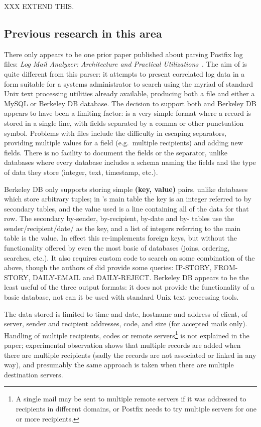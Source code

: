 XXX EXTEND THIS\@.


\subsection{Previous research in this area}

\label{prior art}

There only appears to be one prior paper published about parsing Postfix
log files: \textit{Log Mail Analyzer: Architecture and Practical
Utilizations\/}~\cite{log-mail-analyser}.  The aim of \LMA{} is quite
different from this parser: it attempts to present correlated log data in a
form suitable for a systems administrator to search using the myriad of
standard Unix text processing utilities already available, producing both a
\CSV{} file and either a MySQL or Berkeley DB database.  The decision to
support both \CSV{} and Berkeley DB appears to have been a limiting factor:
\CSV{} is a very simple format where a record is stored in a single line,
with fields separated by a comma or other punctuation symbol.  Problems
with \CSV{} files include the difficulty in escaping separators, providing
multiple values for a field (e.g.\ multiple recipients) and adding new
fields.  There is no facility to document the fields or the separator,
unlike \SQL{} databases where every database includes a schema naming the
fields and the type of data they store (integer, text, timestamp, etc.).

Berkeley DB only supports storing simple \textbf{(key, value)} pairs,
unlike \SQL{} databases which store arbitrary tuples; in \LMA{}'s main
table the key is an integer referred to by secondary tables, and the value
used is a \CSV{} line containing all of the data for that row.  The
secondary by-sender, by-recipient, by-date and by-\IP{} tables use the
sender/recipient/date/\IP{} as the key, and a \CSV{} list of integers
referring to the main table is the value.  In effect this re-implements
\SQL{} foreign keys, but without the functionality offered by even the most
basic of \SQL{} databases (joins, ordering, searches, etc.).  It also
requires custom code to search on some combination of the above, though the
authors of \LMA{} did provide some queries: IP-STORY, FROM-STORY,
DAILY-EMAIL and DAILY-REJECT\@.  Berkeley DB appears to be the least useful
of the three output formats: it does not provide the functionality of a
basic \SQL{} database, not can it be used with standard Unix text
processing tools.

The data stored is limited to time and date, hostname and \IP{} address of
client, \IP{} of server, sender and recipient addresses, \SMTP{} code, and
size (for accepted mails only).  Handling of multiple recipients, \SMTP{}
codes or remote servers\footnote{A single mail may be sent to multiple
remote servers if it was addressed to recipients in different domains, or
Postfix needs to try multiple servers for one or more recipients.} is not
explained in the paper; experimental observation shows that multiple
records are added when there are multiple recipients (sadly the records are
not associated or linked in any way), and presumably the same approach is
taken when there are multiple destination servers.

